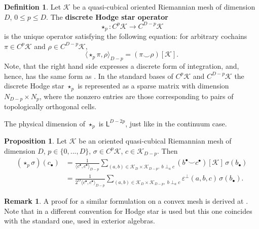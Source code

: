 \documentclass{elsarticle}
\theoremstyle{definition}
\newtheorem{proposition}[theorem]{Proposition}
\newtheorem{definition}[theorem]{Definition}
\newtheorem{remark}[theorem]{Remark}
\newcommand{\inner}[2]{\langle#1,#2\rangle}
\newcommand{\rel}{\varepsilon^\perp}
\newcommand{\newterm}[1]{\textbf{#1}}
\newcommand{\length}{\mathsf{L}}
\begin{document}
\begin{definition}
  Let $\mathcal{K}$ be a quasi-cubical oriented Riemannian mesh of dimension $D$,
  $0 \leq p \leq D$.
  The \newterm{discrete Hodge star operator}
  \begin{equation}
    \star_p \colon C^p \mathcal{K} \to C^{D - p} \mathcal{K}
  \end{equation}
  is the unique operator satisfying the following equation:
  for arbitrary cochains $\pi \in C^p \mathcal{K}$ and $\rho \in C^{D - p} \mathcal{K}$,
  \begin{equation}
    \label{eq:combinatorial/inner_product_with_hodge_star}
     \inner{\star_p \pi}{\rho}_{D - p}
     = (\pi \smile \rho)[\mathcal{K}].
  \end{equation}
  Note, that the right hand side expresses a discrete form of integration, and, hence, has the same form as .
  In the standard bases of $C^p \mathcal{K}$ and $C^{D - p} \mathcal{K}$
  the discrete Hodge star $\star_p$ is represented as a sparse matrix with dimension $N_{D - p} \times N_p$,
  where the nonzero entries are those corresponding to pairs of topologically orthogonal cells.

  The physical dimension of $\star_p$ is $\length^{D - 2 p}$, just like in the continuum case.
\end{definition}
\begin{proposition}
  Let $\mathcal{K}$ be an oriented quasi-cubical Riemannian mesh of dimension $D$,
  $p \in \{0, ..., D\}$,
  $\sigma \in C^p \mathcal{K}$,
  $c \in \mathcal{K}_{D - p}$.
  Then
  \begin{equation}
    \begin{split}
      (\star_p \sigma)(c_\bullet)
      & = \frac{1}{\inner{c^\bullet}{c^\bullet}_{D - p}} \sum_{(a, b) \in \mathcal{K}_D \times \mathcal{K}_{D - p},\ b \perp_a c} (b^\bullet \smile c^\bullet)[\mathcal{K}]\, \sigma(b_\bullet) \\
      & = \frac{1}{2^D \inner{c^\bullet}{c^\bullet}_{D - p}} \sum_{(a, b) \in \mathcal{K}_D \times \mathcal{K}_{D - p},\ b \perp_a c} \rel(a, b, c)\, \sigma(b_\bullet).
    \end{split}
  \end{equation}
\end{proposition}
\begin{remark}
  A proof for a similar formulation on a convex mesh is derived at \cite[Equation 16]{berbatov2022diffusion}.
  Note that in \cite{berbatov2022diffusion,berbatov2023discrete} a different convention for Hodge star is used but this one coincides with the standard one, used in exterior algebras.
\end{remark}
\end{document}
